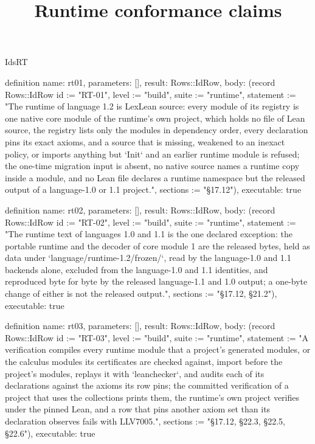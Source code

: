 \begin{lexlean}{IdsRT}
\title{Runtime conformance claims}
\begin{semanticmodule}
definition{
  name: rt01,
  parameters: [],
  result: Rows::IdRow,
  body: (record Rows::IdRow {id := "RT-01", level := "build", suite := "runtime", statement := "The runtime of language 1.2 is LexLean source: every module of its registry is one native core module of the runtime's own project, which holds no file of Lean source, the registry lists only the modules in dependency order, every declaration pins its exact axioms, and a source that is missing, weakened to an inexact policy, or imports anything but `Init` and an earlier runtime module is refused; the one-time migration input is absent, no native source names a runtime copy inside a module, and no Lean file declares a runtime namespace but the released output of a language-1.0 or 1.1 project.", sections := "§17.12"}),
  executable: true
}

definition{
  name: rt02,
  parameters: [],
  result: Rows::IdRow,
  body: (record Rows::IdRow {id := "RT-02", level := "build", suite := "runtime", statement := "The runtime text of languages 1.0 and 1.1 is the one declared exception: the portable runtime and the decoder of core module 1 are the released bytes, held as data under `language/runtime-1.2/frozen/`, read by the language-1.0 and 1.1 backends alone, excluded from the language-1.0 and 1.1 identities, and reproduced byte for byte by the released language-1.1 and 1.0 output; a one-byte change of either is not the released output.", sections := "§17.12, §21.2"}),
  executable: true
}

definition{
  name: rt03,
  parameters: [],
  result: Rows::IdRow,
  body: (record Rows::IdRow {id := "RT-03", level := "build", suite := "runtime", statement := "A verification compiles every runtime module that a project's generated modules, or the calculus modules its certificates are checked against, import before the project's modules, replays it with `leanchecker`, and audits each of its declarations against the axioms its row pins; the committed verification of a project that uses the collections prints them, the runtime's own project verifies under the pinned Lean, and a row that pins another axiom set than its declaration observes fails with LLV7005.", sections := "§17.12, §22.3, §22.5, §22.6"}),
  executable: true
}


\end{semanticmodule}
\end{lexlean}
